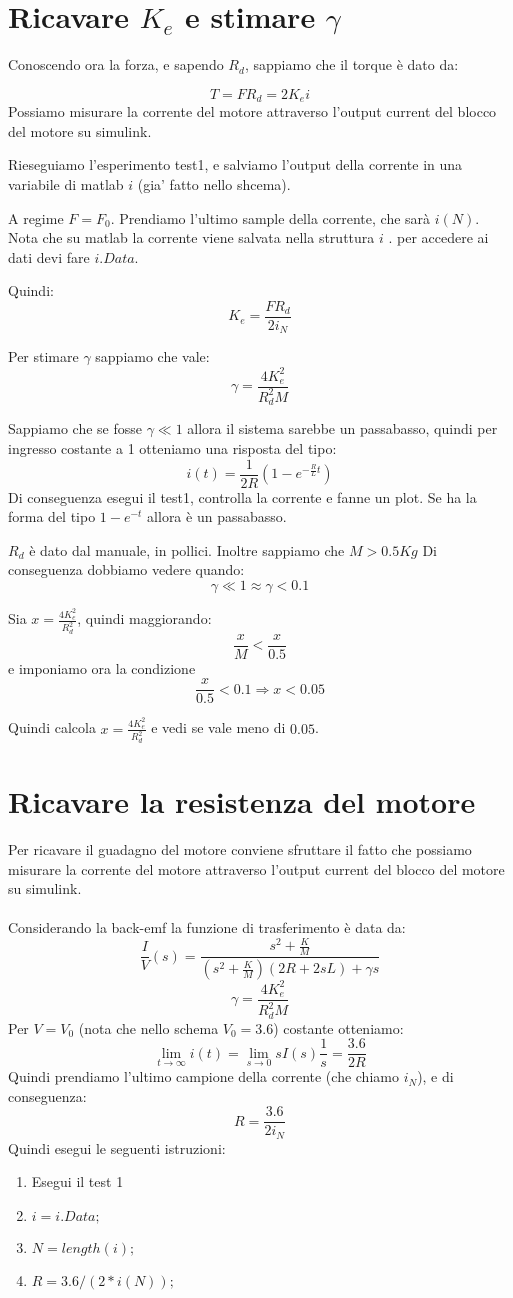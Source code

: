 \documentclass[10pt,a4paper]{article}
\begin{document}
\section{Ricavare $K_e$ e stimare $\gamma$}
Conoscendo ora la forza, e sapendo $R_d$, sappiamo che il torque è dato da:

$$T = FR_d = 2K_e i$$
Possiamo misurare la corrente del motore attraverso l'output current del blocco del motore su simulink.

Rieseguiamo l'esperimento test1, e salviamo l'output della corrente in una variabile di matlab $i$ (gia' fatto nello shcema).

A regime $F=F_0$. Prendiamo l'ultimo sample della corrente, che sarà $i(N)$. Nota che su matlab la corrente viene salvata nella struttura $i$ . per accedere ai dati devi fare $i.Data$.

 Quindi:
$$K_e = \frac{FR_d}{2i_N}$$

Per stimare $\gamma$ sappiamo che vale:
$$\gamma = \frac{4K_e^2}{R_d^2M}$$

Sappiamo che se fosse $\gamma \ll 1$ allora il sistema sarebbe un passabasso, quindi per ingresso costante a 1 otteniamo una risposta del tipo:
$$i(t) = \frac{1}{2R}(1-e^{-\frac{R}{L}t})$$
Di conseguenza esegui il test1, controlla la corrente e fanne un plot. Se ha la forma del tipo $1-e^{-t}$ allora è un passabasso.

$R_d$ è dato dal manuale, in pollici. Inoltre sappiamo che $M > 0.5Kg$
Di conseguenza dobbiamo vedere quando:
$$\gamma \ll 1 \approx \gamma < 0.1$$

Sia $ x= \frac{4K_e^2}{R_d^2}$, quindi maggiorando:
$$ \frac{x}{M} < \frac{x}{0.5}$$
e imponiamo ora la condizione
$$\frac{x}{0.5}<0.1 \Rightarrow x < 0.05$$

Quindi calcola $ x= \frac{4K_e^2}{R_d^2}$ e vedi se vale meno di $0.05$.

\newpage
\section{Ricavare la resistenza del motore}
Per ricavare il guadagno del motore conviene sfruttare il fatto che possiamo misurare la corrente del motore attraverso l'output current del blocco del motore su simulink. \\ \\
Considerando la back-emf la funzione di trasferimento è data da:
$$\frac{I}{V}(s) = \frac{s^2+\frac{K}{M}}{(s^2+\frac{K}{M})(2R+2sL)+\gamma s}$$
$$\gamma = \frac{4K_e^2}{R_d^2M}$$
Per $V=V_0$ (nota che nello schema $V_0=3.6$) costante otteniamo:
$$\lim_{t \to \infty} i(t) = \lim_{s \to 0} sI(s)\frac{1}{s} = \frac{3.6}{2R}$$
Quindi prendiamo l'ultimo campione della corrente (che chiamo $i_N$), e di conseguenza:
$$R = \frac{3.6}{2i_N}$$
Quindi esegui le seguenti istruzioni:
\begin{enumerate}
\item Esegui il test 1
\item $i=i.Data;$
\item $N=length(i);$
\item $ R = 3.6/(2*i(N));$
\end{enumerate}
\end{document}
